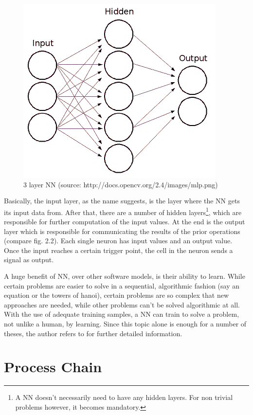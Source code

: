 \begin{figure}[H]
	\begin{center}
		\includegraphics[scale=0.7]{img/mlp.png}
		\caption{3 layer NN (source: http://docs.opencv.org/2.4/\textunderscore images/mlp.png)}
		\label{fig:fig2.2}
	\end{center}
\end{figure}

Basically, the input layer, as the name suggests, is the layer where the NN gets its input data from. After that, there are a number of hidden layers\footnote{A NN doesn't necessarily need to have any hidden layers. For non trivial problems however, it becomes mandatory.}, which are responsible for further computation of the input values. At the end is the output layer which is responsible for communicating the results of the prior operations (compare fig. 2.2). Each single neuron has input values and an output value. Once the input reaches a certain trigger point, the cell in the neuron sends a signal as output. 

A huge benefit of NN, over other software models, is their ability to learn. While certain problems are easier to solve in a sequential, algorithmic fashion (say an equation or the towers of hanoi), certain problems are so complex that new approaches are needed, while other problems can't be solved algorithmic at all. With the use of adequate training samples, a NN can train to solve a problem, not unlike a human, by learning. Since this topic alone is enough for a number of theses, the author refers to \cite{Kriesel07} for further detailed information.


\section{Process Chain}

